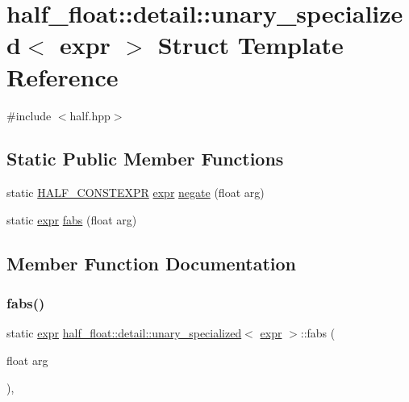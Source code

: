 \hypertarget{structhalf__float_1_1detail_1_1unary__specialized_3_01expr_01_4}{}\section{half\+\_\+float\+:\+:detail\+:\+:unary\+\_\+specialized$<$ expr $>$ Struct Template Reference}
\label{structhalf__float_1_1detail_1_1unary__specialized_3_01expr_01_4}


{\ttfamily \#include $<$half.\+hpp$>$}

\subsection*{Static Public Member Functions}
\begin{DoxyCompactItemize}
\item 
static \hyperlink{half_8hpp_ace3116a3e2cd66dd15780b92060987c7}{H\+A\+L\+F\+\_\+\+C\+O\+N\+S\+T\+E\+X\+PR} \hyperlink{structhalf__float_1_1detail_1_1expr}{expr} \hyperlink{structhalf__float_1_1detail_1_1unary__specialized_3_01expr_01_4_a52fafe72dd5633b391289700c7d41851}{negate} (float arg)
\item 
static \hyperlink{structhalf__float_1_1detail_1_1expr}{expr} \hyperlink{structhalf__float_1_1detail_1_1unary__specialized_3_01expr_01_4_a8e93062c896cf81bcc9e6d079d55df63}{fabs} (float arg)
\end{DoxyCompactItemize}


\subsection{Member Function Documentation}
\mbox{\label{structhalf__float_1_1detail_1_1unary__specialized_3_01expr_01_4_a8e93062c896cf81bcc9e6d079d55df63}} 
\subsubsection{\texorpdfstring{fabs()}{fabs()}}
{\footnotesize\ttfamily static \hyperlink{structhalf__float_1_1detail_1_1expr}{expr} \hyperlink{structhalf__float_1_1detail_1_1unary__specialized}{half\+\_\+float\+::detail\+::unary\+\_\+specialized}$<$ \hyperlink{structhalf__float_1_1detail_1_1expr}{expr} $>$\+::fabs (\begin{DoxyParamCaption}\item[{float}]{arg }\end{DoxyParamCaption})\hspace{0.3cm}{\ttfamily [inline]}, {\ttfamily [static]}}

